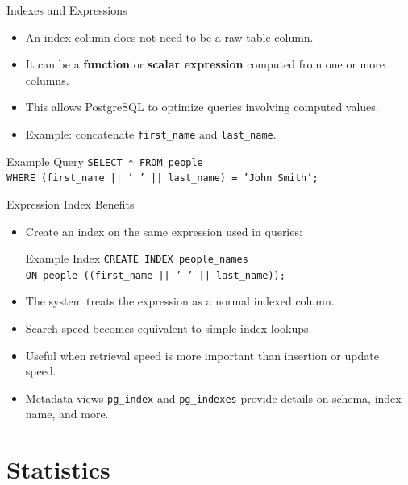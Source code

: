 \documentclass[aspectratio=169]{beamer}
\begin{document}
\begin{frame}{Indexes and Expressions}
  \begin{itemize}
    \item An index column does not need to be a raw table column.
    \item It can be a \textbf{function} or \textbf{scalar expression} computed from one or more columns.
    \item This allows PostgreSQL to optimize queries involving computed values.
    \item Example: concatenate \texttt{first\_name} and \texttt{last\_name}.
  \end{itemize}

  \vspace{0.3cm}
  \begin{exampleblock}{Example Query}
  \scriptsize
  \texttt{SELECT * FROM people \\
  \hspace{0.3cm}WHERE (first\_name || ' ' || last\_name) = 'John Smith';}
  \end{exampleblock}
\end{frame}

\begin{frame}{Expression Index Benefits}
  \begin{itemize}
    \item Create an index on the same expression used in queries:
    \begin{exampleblock}{Example Index}
    \scriptsize
    \texttt{CREATE INDEX people\_names \\
    \hspace{0.3cm}ON people ((first\_name || ' ' || last\_name));}
    \end{exampleblock}
    \item The system treats the expression as a normal indexed column.
    \item Search speed becomes equivalent to simple index lookups.
    \item Useful when retrieval speed is more important than insertion or update speed.
    \item Metadata views \texttt{pg\_index} and \texttt{pg\_indexes} provide details on schema, index name, and more.
  \end{itemize}
\end{frame}

\section{Statistics}
\end{document}
